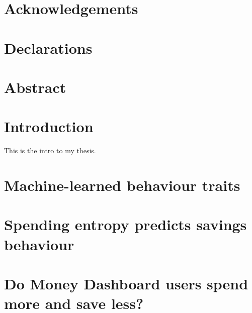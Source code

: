 \documentclass[a4paper, 12pt]{report}
\newcommand{\projects}{/Users/fgu/dev/projects}
\newcommand{\mlbt}{\projects/mlbt/text/paper/sections}
\newcommand{\entropy}{\projects/entropy/text/paper/sections}
\newcommand{\eval}{\projects/mdb_eval/text/paper/sections}
\begin{document}
\tableofcontents
\listoftables
\listoffigures



\chapter*{Acknowledgements}

\chapter*{Declarations}

\chapter*{Abstract}

\chapter*{Introduction}%
\label{cha:introduction}

This is the intro to my thesis.


\chapter{Machine-learned behaviour traits}%
\label{cha:machine_learned_behaviour_traits}






\chapter{Spending entropy predicts savings behaviour}%
\label{cha:spending_entropy_predicts_savings_behaviour}






\appendix



\chapter{Do Money Dashboard users spend more and save less?}%
\label{cha:do_money_dashboard_users_spend_more_and_save_less_}





\appendix


\newpage
\printbibliography
\end{document}
